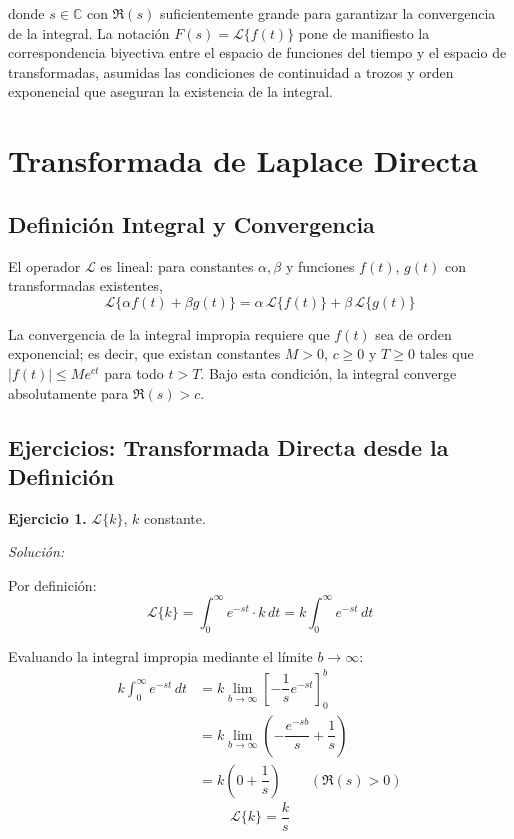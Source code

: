 \documentclass[12pt,letterpaper]{report}
\numberwithin{equation}{chapter}
\numberwithin{figure}{chapter}
\numberwithin{table}{chapter}
\begin{document}
donde $s \in \mathbb{C}$ con $\Re(s)$ suficientemente grande para garantizar la convergencia de la integral. La notación $F(s) = \mathcal{L}\{f(t)\}$ pone de manifiesto la correspondencia biyectiva entre el espacio de funciones del tiempo y el espacio de transformadas, asumidas las condiciones de continuidad a trozos y orden exponencial que aseguran la existencia de la integral.

\section{Transformada de Laplace Directa}

\subsection{Definición Integral y Convergencia}

El operador $\mathcal{L}$ es lineal: para constantes $\alpha, \beta$ y funciones $f(t)$, $g(t)$ con transformadas existentes,
\begin{equation*}
\mathcal{L}\{\alpha f(t) + \beta g(t)\} = \alpha\,\mathcal{L}\{f(t)\} + \beta\,\mathcal{L}\{g(t)\}
\end{equation*}

La convergencia de la integral impropia requiere que $f(t)$ sea de orden exponencial; es decir, que existan constantes $M > 0$, $c \geq 0$ y $T \geq 0$ tales que $|f(t)| \leq Me^{ct}$ para todo $t > T$. Bajo esta condición, la integral converge absolutamente para $\Re(s) > c$.

\subsection{Ejercicios: Transformada Directa desde la Definición}

\textbf{Ejercicio 1.} $\mathcal{L}\{k\}$, $k$ constante.

\textit{Solución:}

Por definición:
\[
\mathcal{L}\{k\} = \int_{0}^{\infty} e^{-st}\cdot k\,dt = k\int_{0}^{\infty} e^{-st}\,dt
\]

Evaluando la integral impropia mediante el límite $b \to \infty$:
\begin{align*}
k\int_{0}^{\infty} e^{-st}\,dt &= k\lim_{b\to\infty}\left[-\dfrac{1}{s}e^{-st}\right]_{0}^{b} \\[4pt]
&= k\lim_{b\to\infty}\left(-\dfrac{e^{-sb}}{s} + \dfrac{1}{s}\right) \\[4pt]
&= k\left(0 + \dfrac{1}{s}\right) \qquad (\Re(s) > 0)
\end{align*}
\[
\boxed{\mathcal{L}\{k\} = \dfrac{k}{s}}
\]
\end{document}
